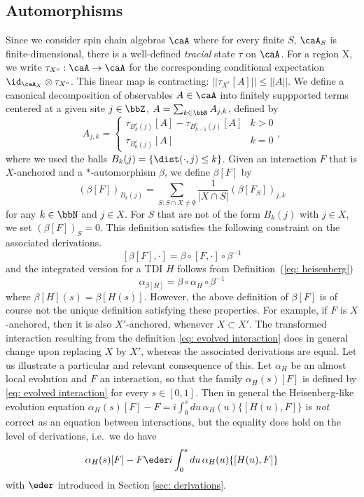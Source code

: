 \subsection{Automorphisms}\label{sec: automorphisms}
Since we consider spin chain algebras $\caA$ where for every finite $S$, $\caA_S$ is finite-dimensional, there is a well-defined \emph{tracial} state $\tau$ on $\caA$. For a region X, we write  $ \tau_{X^c}:\caA \to \caA$ for the corresponding conditional expectation $\id_{\caA_X}\otimes \tau_{X^c}$. This linear map is contracting:  $|| \tau_{X^c}[A] || \leq ||A||$.  We define a canonical decomposition of observables  $A\in\caA$ into finitely suppported terms centered at a given site $j \in\bbZ$, $A=\sum_{k\in\bbN} A_{j,k}$, defined by 
\begin{equation}\label{eq: decomposition finite}
A_{j,k}=\begin{cases}  \tau_{B^c_{k}(j)}[A]- \tau_{B^c_{k-1}(j)} [A]  &  k>0  \\
\tau_{B^c_{0}(j)}[A] & k=0
\end{cases},
\end{equation}
where we used the balls $B_k(j)=\{  \dist(\cdot,j)\leq k\}$. 
Given an interaction $F$ that is $X$-anchored and a $*$-automorphism $\beta$, we define $\beta[F]$ by
\begin{equation} \label{eq: evolved interaction}
(\beta[F])_{B_k(j)}=\sum_{S: S \cap X \neq \emptyset} \frac{1}{|X\cap S|}     (\beta[F_S])_{j,k}
\end{equation}
for any $k\in\bbN$ and $j\in X$. For $S$ that are not of the form $B_k(j)$ with $j\in X$, we set $(\beta[F])_{S}=0$. 
This definition satisfies the following constraint on the associated derivations. 
\begin{equation} \label{eq: commutation autos}
[\beta[F],\cdot]= \beta \circ [F,\cdot] \circ \beta^{-1}
\end{equation}
and the integrated version for a TDI $H$ follows from Definition~(\ref{eq: heisenberg})
\begin{equation} \label{eq: commutation autos integrated}
\alpha_{\beta[H]}= \beta \circ \alpha_H \circ \beta^{-1}
\end{equation}
where $\beta[H](s)=\beta[H(s)]$. 
However, the above definition of $\beta[F]$ is of course not the unique definition satisfying these properties. For example, if $F$ is $X$-anchored, then it is also $X'$-anchored, whenever $ X\subset X'$. The transformed interaction resulting  from the definition \eqref{eq: evolved interaction} does in general change upon replacing $X$ by $X'$, whereas the associated derivations are equal.  
Let us illustrate a particular  and relevant consequence of this. Let $\alpha_H$ be an almost local evolution and $F$ an interaction, so that the family 
$\alpha_H(s)[F]$ is defined by \eqref{eq: evolved interaction} for every $s\in [0,1]$.  Then in general the Heisenberg-like evolution equation $
\alpha_H(s)[F] - F=  i\int_{0}^{s}  du \,   \alpha_H(u) \{[H(u),F]\}
$ 
is \emph{not} correct as an equation between interactions, but the equality does hold on the level of derivations, i.e.\ we do have
$$
\alpha_H(s)[F] - F \eder  i\int_{0}^{s} du  \,  \alpha_H(u)  \{[H(u),F]\}
$$ 
with $\eder$ introduced in Section \ref{sec: derivations}. 


